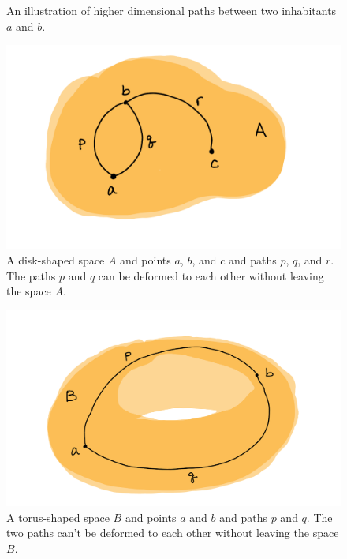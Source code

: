 \documentclass{amsart}
\theoremstyle{definition}
\begin{document}
\begin{figure}[h]
    \centering
    
    \caption{An illustration of higher dimensional paths between two inhabitants $a$ and $b$.}
    \label{fig:n-paths}
\end{figure}

\begin{figure}[h]
    \centering
    \includegraphics[scale=0.5]{disk.png}
    \caption{A disk-shaped space $A$ and points $a$, $b$, and $c$ and paths $p$, $q$, and $r$.
    The paths $p$ and $q$ can be deformed to each other without leaving the space $A$.}
    \label{fig:disk}
\end{figure}

\begin{figure}[h]
    \centering
    \includegraphics[scale=0.5]{torus.png}
    \caption{A torus-shaped space $B$ and points $a$ and $b$ and paths $p$ and $q$.
    The two paths can't be deformed to each other without leaving the space $B$.}
    \label{fig:torus}
\end{figure}
\end{document}
